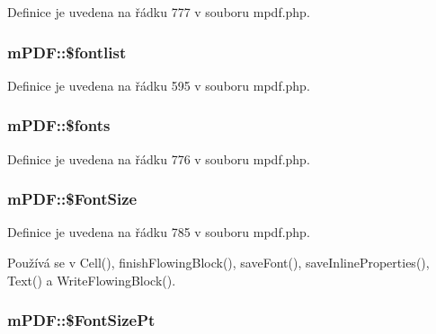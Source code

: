 Definice je uvedena na řádku 777 v souboru mpdf.\-php.

\hypertarget{classm_p_d_f_ab666dc139f5ef2e951276a93d7a12faf}{
\subsubsection[{\$fontlist}]{\setlength{\rightskip}{0pt plus 5cm}m\-P\-D\-F\-::\$fontlist}}\label{classm_p_d_f_ab666dc139f5ef2e951276a93d7a12faf}


Definice je uvedena na řádku 595 v souboru mpdf.\-php.

\hypertarget{classm_p_d_f_acfe6b2d9106432b65e97a383d870b94d}{
\subsubsection[{\$fonts}]{\setlength{\rightskip}{0pt plus 5cm}m\-P\-D\-F\-::\$fonts}}\label{classm_p_d_f_acfe6b2d9106432b65e97a383d870b94d}


Definice je uvedena na řádku 776 v souboru mpdf.\-php.

\hypertarget{classm_p_d_f_a4e76010241061259c347975e690dcb06}{
\subsubsection[{\$\-Font\-Size}]{\setlength{\rightskip}{0pt plus 5cm}m\-P\-D\-F\-::\$\-Font\-Size}}\label{classm_p_d_f_a4e76010241061259c347975e690dcb06}


Definice je uvedena na řádku 785 v souboru mpdf.\-php.



Používá se v Cell(), finish\-Flowing\-Block(), save\-Font(), save\-Inline\-Properties(), Text() a Write\-Flowing\-Block().

\hypertarget{classm_p_d_f_a1d88cfab00ee90cdd71d9060c0a08e4a}{
\subsubsection[{\$\-Font\-Size\-Pt}]{\setlength{\rightskip}{0pt plus 5cm}m\-P\-D\-F\-::\$\-Font\-Size\-Pt}}\label{classm_p_d_f_a1d88cfab00ee90cdd71d9060c0a08e4a}


